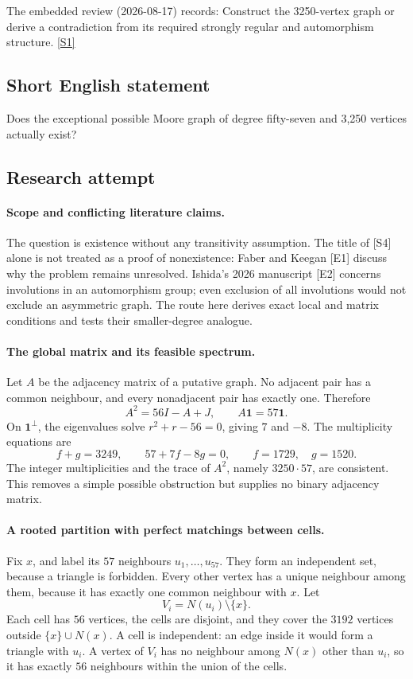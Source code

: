 \documentclass[11pt,a4paper]{article}
\newcommand{\sref}[2]{\hyperlink{source:#1:#2}{[S#2]}}
\begin{document}
The embedded review (2026-08-17) records: Construct the 3250-vertex graph or derive a contradiction from its required strongly regular and automorphism structure. \sref{1413}{1}

\subsection{Short English statement}

Does the exceptional possible Moore graph of degree fifty-seven and 3,250 vertices actually exist?

\subsection{Research attempt}

\paragraph{Scope and conflicting literature claims.}
The question is existence without any transitivity assumption. The
title of [S4] alone is not treated as a proof of nonexistence: Faber
and Keegan [E1] discuss why the problem remains unresolved. Ishida's
2026 manuscript [E2] concerns involutions in an automorphism group;
even exclusion of all involutions would not exclude an asymmetric
graph. The route here derives exact local and matrix conditions and
tests their smaller-degree analogue.

\paragraph{The global matrix and its feasible spectrum.}
Let $A$ be the adjacency matrix of a putative graph. No adjacent pair
has a common neighbour, and every nonadjacent pair has exactly one.
Therefore
\[
                   A^2=56I-A+J,
                   \qquad A\mathbf1=57\mathbf1.
\]
On $\mathbf1^\perp$, the eigenvalues solve $r^2+r-56=0$,
giving $7$ and $-8$. The multiplicity equations are
\[
                 f+g=3249,\qquad57+7f-8g=0,
                 \qquad f=1729,\quad g=1520.
\]
The integer multiplicities and the trace of $A^2$, namely
$3250\cdot57$, are consistent. This removes a simple possible
obstruction but supplies no binary adjacency matrix.

\paragraph{A rooted partition with perfect matchings between cells.}
Fix $x$, and label its $57$ neighbours $u_1,\ldots,u_{57}$.
They form an independent set, because a triangle is forbidden.
Every other vertex has a unique neighbour among them, because it has
exactly one common neighbour with $x$. Let
\[
                       V_i=N(u_i)\setminus\{x\}.
\]
Each cell has $56$ vertices, the cells are disjoint, and they cover
the $3192$ vertices outside $\{x\}\cup N(x)$. A cell is independent:
an edge inside it would form a triangle with $u_i$. A vertex of
$V_i$ has no neighbour among $N(x)$ other than $u_i$, so it has
exactly $56$ neighbours within the union of the cells.
\end{document}
